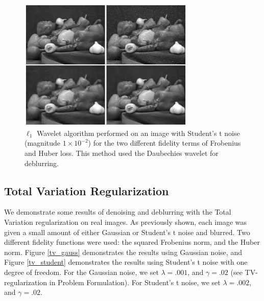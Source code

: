 \documentclass[10pt,a4paper]{article}
\begin{document}
\begin{figure}[H]
\begin{center}
\includegraphics[width = 0.75\textwidth]{../figures/waveletStudentD.pdf} 
\end{center}
\caption{$\ell_1$ Wavelet algorithm performed on an image with Student's t noise (magnitude $1 \times 10^{-2}$) for the two different fidelity terms of Frobenius and Huber loss. This method used the Daubechies wavelet for deblurring.}
\label{waveletD_student}
\end{figure}

\subsection{Total Variation Regularization}

We demonstrate some results of denoising and deblurring with the Total Variation regularization on real images. As previously shown, each image was given a small amount of either Gaussian or Student's t noise and blurred. Two different fidelity functions were used: the squared Frobenius norm, and the Huber norm. Figure \ref{tv_gauss} demonstrates the results using Gaussian noise, and Figure \ref{tv_student} demonstrates the results using Student's t noise with one degree of freedom. For the Gaussian noise, we set $\lambda = .001$, and $\gamma = .02$ (see TV-regularization in Problem Formulation). For Student's t noise, we set $\lambda = .002$, and $\gamma = .02$.
\end{document}
